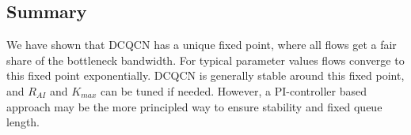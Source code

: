 \subsection{Summary}
We have shown that DCQCN has a unique fixed point, where all flows get a fair
share of the bottleneck bandwidth. For typical parameter values flows converge
to this fixed point exponentially.
DCQCN is generally stable around this fixed
point, and $R_{AI}$ and $K_{max}$ can be tuned if needed.  However, a
PI-controller based approach may be the more principled way to ensure stability
and fixed queue length.
